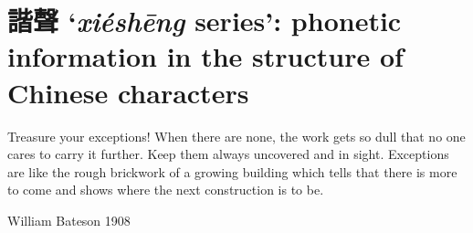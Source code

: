 \chapter{諧聲 `\emph{xiéshēng} series':  phonetic information in the structure of Chinese characters}

\epigraph{Treasure your exceptions! When there are none, the work gets so
dull that no one cares to carry it further. Keep them always uncovered and in sight. Exceptions are like the rough brickwork of a
growing building which tells that there is more to come and shows
where the next construction is to be.}{William Bateson 1908}

